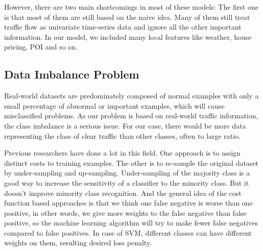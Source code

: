 However, there are two main shortcomings in most of these models: 
The first one is that most of them are still based on the naive idea. Many of them still treat traffic flow as univariate time-series data 
and ignore all the other important information. 
In our model, we included many local features like weather, 
house pricing, POI and so on.

\subsection{Data Imbalance Problem}
Real-world datasets are predominately composed of normal examples with only a small percentage of abnormal or important examples, which will cause misclassified problems. As our problem is based on real-world traffic information, the class imbalance is a serious issue. For our case, there would be more data representing the class of clear traffic than other classes, often to large ratio. 

Previous researchers have done a lot in this field. One approach is to assign distinct costs to training examples. The other is to re-sample the original dataset by under-sampling and up-sampling. Under-sampling of the majority class is a good way to increase the sensitivity of a classifier to the minority class. But it doesn't improve minority class recognition. And the general idea of the cost function based approaches is that we think one false negative is worse than one positive, in other words, we give more weights to the false negative than false positive, so the machine learning algorithm will try to make fewer false negatives compared to false positives. In case of SVM, different classes can have different weights on them, resulting desired loss penalty.

%

%

